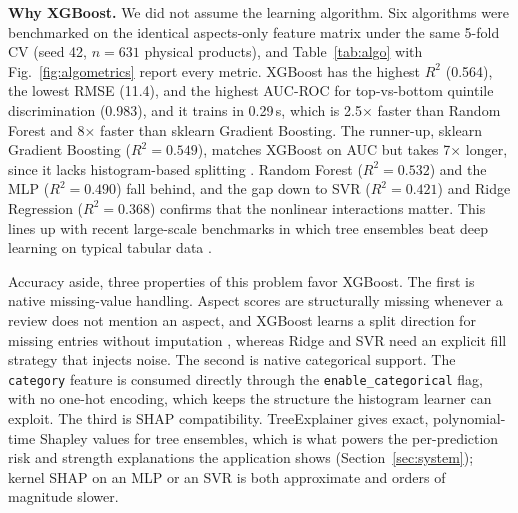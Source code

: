 \documentclass[journal]{IEEEtran}
\begin{document}
\textbf{Why XGBoost.} We did not assume the learning algorithm. Six algorithms were benchmarked on the identical aspects-only feature matrix under the same 5-fold CV (seed 42, $n = 631$ physical products), and Table~\ref{tab:algo} with Fig.~\ref{fig:algometrics} report every metric. XGBoost has the highest $R^2$ (0.564), the lowest RMSE (11.4), and the highest AUC-ROC for top-vs-bottom quintile discrimination (0.983), and it trains in 0.29\,s, which is 2.5$\times$ faster than Random Forest and 8$\times$ faster than sklearn Gradient Boosting. The runner-up, sklearn Gradient Boosting ($R^2 = 0.549$), matches XGBoost on AUC but takes 7$\times$ longer, since it lacks histogram-based splitting \cite{ke2017lightgbm}. Random Forest \cite{breiman2001random} ($R^2 = 0.532$) and the MLP ($R^2 = 0.490$) fall behind, and the gap down to SVR \cite{cortes1995svm} ($R^2 = 0.421$) and Ridge Regression \cite{hoerl1970ridge} ($R^2 = 0.368$) confirms that the nonlinear interactions matter. This lines up with recent large-scale benchmarks in which tree ensembles beat deep learning on typical tabular data \cite{grinsztajn2022tree,shwartzziv2022tabular}.

Accuracy aside, three properties of this problem favor XGBoost. The first is native missing-value handling. Aspect scores are structurally missing whenever a review does not mention an aspect, and XGBoost learns a split direction for missing entries without imputation \cite{chen2016xgboost}, whereas Ridge and SVR need an explicit fill strategy that injects noise. The second is native categorical support. The \texttt{category} feature is consumed directly through the \texttt{enable\_categorical} flag, with no one-hot encoding, which keeps the structure the histogram learner can exploit. The third is SHAP compatibility. TreeExplainer \cite{lundberg2017shap} gives exact, polynomial-time Shapley values for tree ensembles, which is what powers the per-prediction risk and strength explanations the application shows (Section~\ref{sec:system}); kernel SHAP on an MLP or an SVR is both approximate and orders of magnitude slower.
\end{document}
